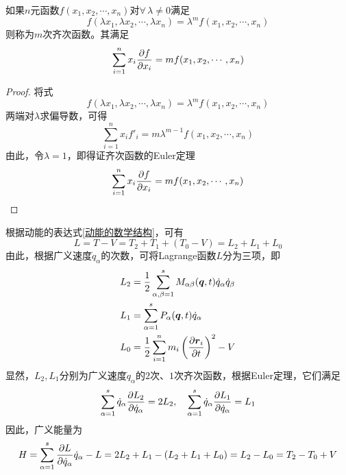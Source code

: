 \begin{theorem}[齐次函数的Euler定理]
\label{齐次函数的Euler定理}
如果$n$元函数$f(x_1,x_2,\cdots,x_n)$对$\forall \, \lambda \neq 0$满足
\begin{equation*}
	f(\lambda x_1,\lambda x_2,\cdots,\lambda x_n) = \lambda^m f(x_1,x_2,\cdots,x_n)
\end{equation*}
则称为$m$次{\heiti 齐次函数}。其满足
\begin{equation}
	\sum_{i=1}^n x_i \frac{\partial f}{\partial x_i} = mf(x_1,x_2,\cdots,x_n)
\end{equation}
\end{theorem}
\begin{proof}
将式
\begin{equation*}
	f(\lambda x_1,\lambda x_2,\cdots,\lambda x_n) = \lambda^m f(x_1,x_2,\cdots,x_n)
\end{equation*}
两端对$\lambda$求偏导数，可得
\begin{equation*}
	\sum_{i=1}^n x_i f'_i = m\lambda^{m-1} f(x_1,x_2,\cdots,x_n)
\end{equation*}
由此，令$\lambda = 1$，即得证齐次函数的Euler定理
\begin{equation*}
	\sum_{i=1}^n x_i \frac{\partial f}{\partial x_i} = mf(x_1,x_2,\cdots,x_n) \qedhere
\end{equation*}
\end{proof}

根据动能的表达式\eqref{动能的数学结构}，可有
\begin{equation*}
	L = T-V = T_2 + T_1 + (T_0 - V) = L_2 + L_1 + L_0
\end{equation*}
由此，根据广义速度$\dot{q}_\alpha$的次数，可将Lagrange函数$L$分为三项，即
\begin{align*}
	L_2 & = \frac12 \sum_{\alpha,\beta=1}^s M_{\alpha\beta}(\boldsymbol{q},t) \dot{q}_\alpha \dot{q}_\beta \\
	L_1 & = \sum_{\alpha=1}^s P_\alpha(\boldsymbol{q},t) \dot{q}_\alpha \\
	L_0 & = \frac12 \sum_{i=1}^n m_i \left(\frac{\partial \boldsymbol{r}_i}{\partial t}\right)^2 - V
\end{align*}
显然，$L_2,L_1$分别为广义速度$\dot{q}_\alpha$的$2$次、$1$次齐次函数，根据Euler定理，它们满足
\begin{equation*}
	\sum_{\alpha=1}^s \dot{q}_\alpha \frac{\partial L_2}{\partial \dot{q}_\alpha} = 2L_2,\quad \sum_{\alpha=1}^s \dot{q}_\alpha \frac{\partial L_1}{\partial \dot{q}_\alpha} = L_1
\end{equation*}
因此，广义能量为
\begin{equation*}
	H = \sum_{\alpha=1}^s \frac{\partial L}{\partial \dot{q}_\alpha} \dot{q}_\alpha - L = 2L_2 + L_1 - (L_2+L_1+L_0) = L_2 - L_0 = T_2 - T_0 + V
\end{equation*}

